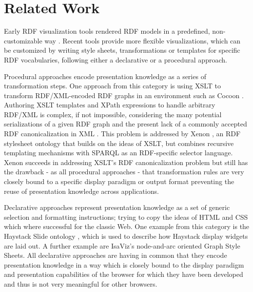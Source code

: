 \section{Related Work}

Early RDF visualization tools rendered RDF models in a predefined, non-customizable way \cite{Steer03}. Recent tools provide more flexible visualizations, which can be customized by writing style sheets, transformations or templates for specific RDF vocabularies, following either a declarative or a procedural approach.

Procedural approaches encode presentation knowledge as a series of transformation steps. One approach from this category is using XSLT to transform RDF/XML-encoded RDF graphs in an environment such as Cocoon \cite{cocoon05}. Authoring XSLT templates and XPath expressions to handle arbitrary RDF/XML is complex, if not impossible, considering the many potential serializations of a given RDF graph and the present lack of a commonly accepted RDF canonicalization in XML \cite{Carroll04}. This problem is addressed by Xenon \cite{quan05}, an RDF stylesheet ontology that builds on the ideas of XSLT, but combines recursive templating mechanisms with SPARQL as an RDF-specific selector language. Xenon succeeds in addressing XSLT's RDF canonicalization problem but still has the drawback - as all procedural approaches - that transformation rules are very closely bound to a specific display paradigm or output format preventing the reuse of presentation knowledge across applications. 

Declarative approaches represent presentation knowledge as a set of generic selection and formatting instructions; trying to copy the ideas of HTML and CSS which where successful for the classic Web. One example from this category is the Haystack Slide ontology \cite{HaystackUI03}, which is used to describe how Haystack display widgets are laid out. A further example are IsaViz's node-and-arc oriented Graph Style Sheets\cite{gss03}. All declarative approaches are having in common that they encode presentation knowledge in a way which is closely bound to the display paradigm and presentation capabilities of the browser for which they have been developed and thus is not very meaningful for other browsers.